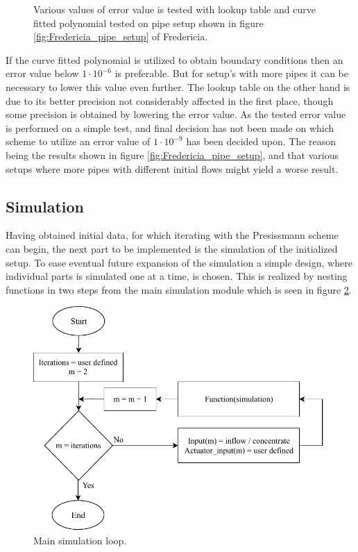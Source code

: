 \begin{figure}[H]
 \centering
 
\caption{Various values of error value is tested with lookup table and curve fitted polynomial tested on pipe setup shown in figure \ref{fig:Fredericia_pipe_setup} of Fredericia.}
\label{fig:error_value_test}
\end{figure} 

If the curve fitted polynomial is utilized to obtain boundary conditions then an error value below $1\cdot10^{-6}$ is preferable. But for setup's with more pipes it can be necessary to lower this value even further. The lookup table on the other hand is due to its better precision not considerably affected in the first place, though some precision is obtained by lowering the error value. As the tested error value is performed on a simple test, and final decision has not been made on which scheme to utilize an error value of $1\cdot10^{-9}$ has been decided upon. The reason being the results shown in figure \ref{fig:Fredericia_pipe_setup}, and that various setups where more pipes with different initial flows might yield a worse result.


\subsection*{Simulation}

Having obtained initial data, for which iterating with the Presissmann scheme can begin, the next part to be implemented is the simulation of the initialized setup.
To ease eventual future expansion of the simulation a simple design, where individual parts is simulated one at a time, is chosen. This is realized by nesting functions in two steps from the main simulation module which is seen in figure \ref{fig:simu_main_chart}.

\begin{figure}[H]
\centering
\includegraphics[width=0.7 \textwidth]{report/simulation/pictures/simu_main_chart.pdf}
\caption{Main simulation loop.}
\label{fig:simu_main_chart}
\end{figure}

